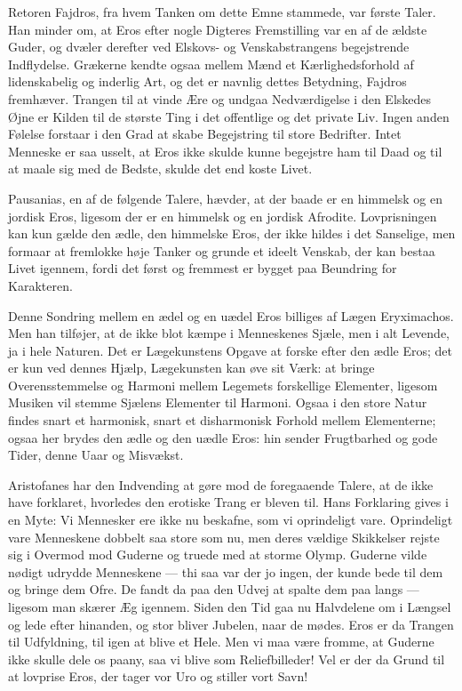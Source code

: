 \documentclass[12pt,a4paper,openany]{book}
\newcommand{\opage}[1]{\marginnote{\footnotesize\textit{[#1]}}}
\begin{document}
Retoren Fajdros, fra hvem Tanken om dette Emne stammede,
var første Taler. Han minder om, at Eros efter nogle
Digteres Fremstilling var en af de ældste Guder, og dvæler derefter
ved Elskovs- og Venskabstrangens begejstrende Indflydelse.
Grækerne kendte ogsaa mellem Mænd et Kærlighedsforhold af
lidenskabelig og inderlig Art, og det er navnlig dettes Betydning,
Fajdros fremhæver. Trangen til at vinde Ære og undgaa Nedværdigelse
i den Elskedes Øjne er Kilden til de største Ting i
det offentlige og det private Liv. Ingen anden Følelse forstaar
i den Grad at skabe Begejstring til store Bedrifter. Intet Menneske
er saa usselt, at Eros ikke skulde kunne begejstre ham
til Daad og til at maale sig med de Bedste, skulde det end koste
Livet.

\setcounter{footnote}{0}%
\opage{85}Pausanias, en af de følgende Talere, hævder, at der baade
er en himmelsk og en jordisk Eros, ligesom der er en himmelsk
og en jordisk Afrodite. Lovprisningen kan kun gælde den ædle,
den himmelske Eros, der ikke hildes i det Sanselige, men formaar
at fremlokke høje Tanker og grunde et ideelt Venskab, der
kan bestaa Livet igennem, fordi det først og fremmest er bygget
paa Beundring for Karakteren.

Denne Sondring mellem en ædel og en uædel Eros billiges
af Lægen Eryximachos. Men han tilføjer, at de ikke blot kæmpe
i Menneskenes Sjæle, men i alt Levende, ja i hele Naturen. Det
er Lægekunstens Opgave at forske efter den ædle Eros; det er
kun ved dennes Hjælp, Lægekunsten kan øve sit Værk: at
bringe Overensstemmelse og Harmoni mellem Legemets forskellige
Elementer, ligesom Musiken vil stemme Sjælens Elementer
til Harmoni. Ogsaa i den store Natur findes snart et harmonisk,
snart et disharmonisk Forhold mellem Elementerne; ogsaa her
brydes den ædle og den uædle Eros: hin sender Frugtbarhed
og gode Tider, denne Uaar og Misvækst.

Aristofanes har den Indvending at gøre mod de foregaaende
Talere, at de ikke have forklaret, hvorledes den erotiske Trang
er bleven til. Hans Forklaring gives i en Myte: Vi Mennesker
ere ikke nu beskafne, som vi oprindeligt vare. Oprindeligt vare
Menneskene dobbelt saa store som nu, men deres vældige Skikkelser
rejste sig i Overmod mod Guderne og truede med at
storme Olymp. Guderne vilde nødigt udrydde Menneskene
--- thi saa var der jo ingen, der kunde bede til dem og bringe dem
Ofre. De fandt da paa den Udvej at spalte dem paa langs
--- ligesom man skærer Æg igennem. Siden den Tid gaa nu Halvdelene
om i Længsel og lede efter hinanden, og stor bliver
Jubelen, naar de mødes. Eros er da Trangen til Udfyldning, til
igen at blive et Hele. Men vi maa være fromme, at Guderne
ikke skulle dele os paany, saa vi blive som Reliefbilleder! Vel
er der da Grund til at lovprise Eros, der tager vor Uro og
stiller vort Savn!
\end{document}
